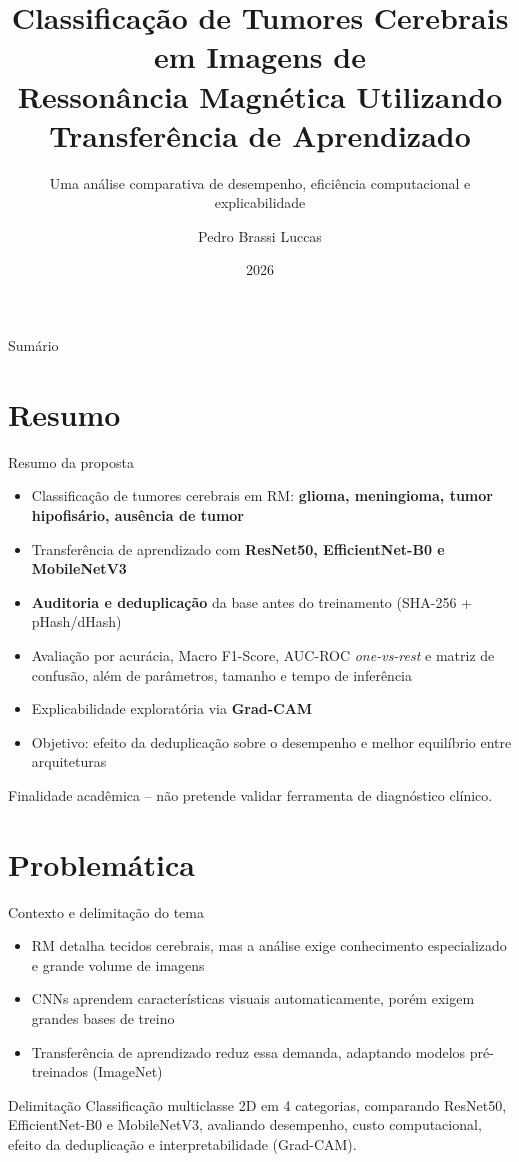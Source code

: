 \documentclass[aspectratio=169]{beamer}
\title[Classificação de Tumores Cerebrais em RM]{Classificação de Tumores Cerebrais em Imagens de\\ Ressonância Magnética Utilizando Transferência de Aprendizado}
\subtitle{Uma análise comparativa de desempenho, eficiência computacional e explicabilidade}
\author{Pedro Brassi Luccas}
\institute[UNIFAL]{Universidade Federal de Alfenas -- UNIFAL \\ Ciência da Computação \\[4pt] \small Orientador: Professor Doutor Luiz Eduardo da Silva}
\date{2026}
\begin{document}
\begin{frame}
  \titlepage
\end{frame}

\begin{frame}{Sumário}
  \tableofcontents
\end{frame}

\section{Resumo}
\begin{frame}{Resumo da proposta}
  \begin{itemize}
    \item Classificação de tumores cerebrais em RM: \textbf{glioma, meningioma, tumor hipofisário, ausência de tumor}
    \item Transferência de aprendizado com \textbf{ResNet50, EfficientNet-B0 e MobileNetV3}
    \item \textbf{Auditoria e deduplicação} da base antes do treinamento (SHA-256 + pHash/dHash)
    \item Avaliação por acurácia, Macro F1-Score, AUC-ROC \textit{one-vs-rest} e matriz de confusão, além de parâmetros, tamanho e tempo de inferência
    \item Explicabilidade exploratória via \textbf{Grad-CAM}
    \item[\(\to\)] Objetivo: efeito da deduplicação sobre o desempenho e melhor equilíbrio entre arquiteturas
  \end{itemize}
  \vfill
  {\footnotesize Finalidade acadêmica -- não pretende validar ferramenta de diagnóstico clínico.}
\end{frame}

\section{Problemática}

\begin{frame}{Contexto e delimitação do tema}
  \begin{itemize}
    \item RM detalha tecidos cerebrais, mas a análise exige conhecimento especializado e grande volume de imagens
    \item CNNs aprendem características visuais automaticamente, porém exigem grandes bases de treino
    \item Transferência de aprendizado reduz essa demanda, adaptando modelos pré-treinados (ImageNet)
  \end{itemize}
  \vspace{4pt}
  \begin{block}{Delimitação}
    Classificação multiclasse 2D em 4 categorias, comparando ResNet50, EfficientNet-B0 e MobileNetV3, avaliando desempenho, custo computacional, efeito da deduplicação e interpretabilidade (Grad-CAM).
  \end{block}
\end{frame}
\end{document}
